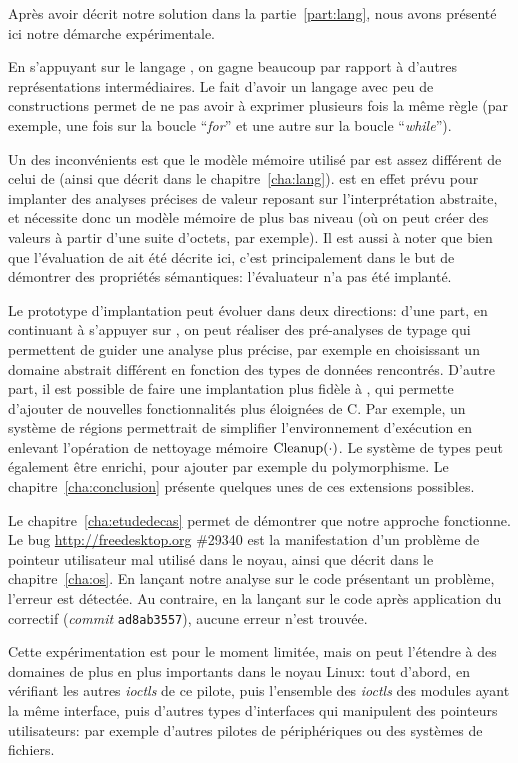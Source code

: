 Après avoir décrit notre solution dans la partie~\ref{part:lang}, nous avons
présenté ici notre démarche expérimentale.

En s'appuyant sur le langage \newspeak, on gagne beaucoup par rapport à d'autres
représentations intermédiaires. Le fait d'avoir un langage avec peu de
constructions permet de ne pas avoir à exprimer plusieurs fois la même règle
(par exemple, une fois sur la boucle ``\emph{for}'' et une autre sur la boucle
``\emph{while}'').

Un des inconvénients est que le modèle mémoire utilisé par \newspeak est assez
différent de celui de \langname (ainsi que décrit dans le
chapitre~\ref{cha:lang}). \newspeak est en effet prévu pour implanter des
analyses précises de valeur reposant sur l'interprétation abstraite, et
nécessite donc un modèle mémoire de plus bas niveau (où on peut créer des
valeurs à partir d'une suite d'octets, par exemple). Il est aussi à noter que
bien que l'évaluation de \langname ait été décrite ici, c'est principalement
dans le but de démontrer des propriétés sémantiques: l'évaluateur n'a pas été
implanté.

Le prototype d'implantation peut évoluer dans deux directions: d'une part, en
continuant à s'appuyer sur \newspeak, on peut réaliser des pré-analyses de
typage qui permettent de guider une analyse plus précise, par exemple en
choisissant un domaine abstrait différent en fonction des types de données
rencontrés. D'autre part, il est possible de faire une implantation plus fidèle
à \langname, qui permette d'ajouter de nouvelles fonctionnalités plus éloignées
de C. Par exemple, un système de régions permettrait de simplifier
l'environnement d'exécution en enlevant l'opération de nettoyage mémoire
$\mathrm{Cleanup}(\cdot)$. Le système de types peut également être enrichi, pour ajouter
par exemple du polymorphisme. Le chapitre~\ref{cha:conclusion} présente quelques
unes de ces extensions possibles.

Le chapitre~\ref{cha:etudedecas} permet de démontrer que notre approche
fonctionne. Le bug \url{http://freedesktop.org} \#29340 est la manifestation
d'un problème de pointeur utilisateur mal utilisé dans le noyau, ainsi que
décrit dans le chapitre~\ref{cha:os}. En lançant notre analyse sur le code
présentant un problème, l'erreur est détectée. Au contraire, en la lançant sur
le code après application du correctif (\emph{commit} \texttt{ad8ab3557}),
aucune erreur n'est trouvée.

Cette expérimentation est pour le moment limitée, mais on peut l'étendre à des
domaines de plus en plus importants dans le noyau Linux: tout d'abord, en
vérifiant les autres \emph{ioctls} de ce pilote, puis l'ensemble des
\emph{ioctls} des modules ayant la même interface, puis d'autres types
d'interfaces qui manipulent des pointeurs utilisateurs: par exemple d'autres
pilotes de périphériques ou des systèmes de fichiers.
